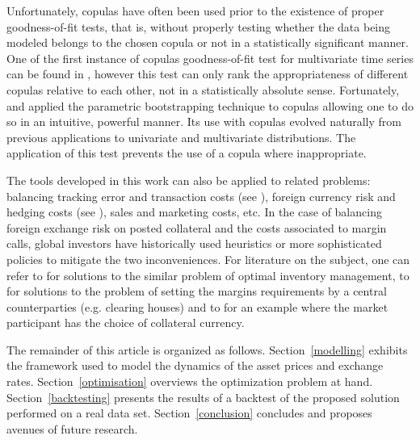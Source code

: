 Unfortunately, copulas have often been used prior to the existence of
proper goodness-of-fit tests, that is, without properly testing whether
the data being modeled belongs to the chosen copula or not in a
statistically significant manner. One of the first instance of copulas
goodness-of-fit test for multivariate time series  can be found in
\cite{chenfan06}, however this test can only rank the appropriateness
of different copulas relative to each other, not in a statistically
absolute sense. Fortunately, \cite{genestetal09} and \cite{Remillard11}
applied the parametric bootstrapping technique to copulas allowing one
to do so in an intuitive, powerful manner. Its use with copulas evolved
naturally from previous applications to univariate and multivariate
distributions. The application of this test prevents the use of a copula
where inappropriate.

The tools developed in this work can also be applied to related problems:
balancing tracking error and transaction costs (see \cite{chanramkumar11}),
foreign currency risk and hedging costs (see \cite{campbell2010}), sales
and marketing costs, etc. In the case of balancing foreign exchange risk
on posted collateral and the costs associated to margin calls, global
investors have historically used heuristics or more sophisticated policies
to mitigate the two inconveniences. For literature on the subject, one
can refer to \cite{MillerOrr, higson10} for solutions to the similar
problem of optimal inventory management, to \cite{cotter01,lam04,kao10,longin99}
for solutions to the problem of setting the margins requirements
by a central counterparties (e.g. clearing houses) and to
\cite{fujii2010} for an example where the market participant has
the choice of collateral currency.

The remainder of this article is organized as follows. Section~\ref{modelling}
exhibits the framework used to model the dynamics of the asset prices and
exchange rates. Section~\ref{optimisation} overviews the optimization problem at
hand. Section~\ref{backtesting} presents the results of a backtest of the
proposed solution performed on a real data set. Section~\ref{conclusion}
concludes and proposes avenues of future research.
